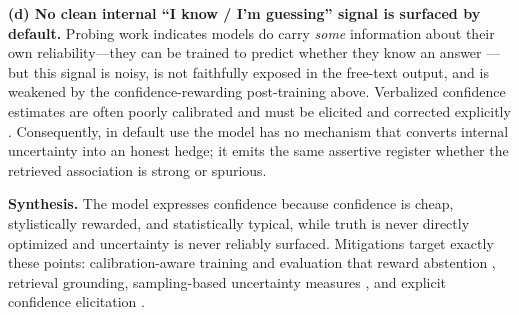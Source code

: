 \documentclass[11pt]{article}
\begin{document}
\textbf{(d) No clean internal ``I know / I'm guessing'' signal is
surfaced by default.}
Probing work indicates models do carry \emph{some} information about
their own reliability---they can be trained to predict whether they know
an answer \citep{kadavath2022know}---but this signal is noisy, is not
faithfully exposed in the free-text output, and is weakened by the
confidence-rewarding post-training above. Verbalized confidence
estimates are often poorly calibrated and must be elicited and corrected
explicitly \citep{lin2022teaching}. Consequently, in default use the
model has no mechanism that converts internal uncertainty into an honest
hedge; it emits the same assertive register whether the retrieved
association is strong or spurious.

\textbf{Synthesis.} The model expresses confidence because confidence is
cheap, stylistically rewarded, and statistically typical, while truth is
never directly optimized and uncertainty is never reliably surfaced.
Mitigations target exactly these points: calibration-aware training and
evaluation that reward abstention \citep{kalai2025hallucinate},
retrieval grounding, sampling-based uncertainty measures
\citep{farquhar2024detecting}, and explicit confidence elicitation
\citep{lin2022teaching}.
\end{document}
